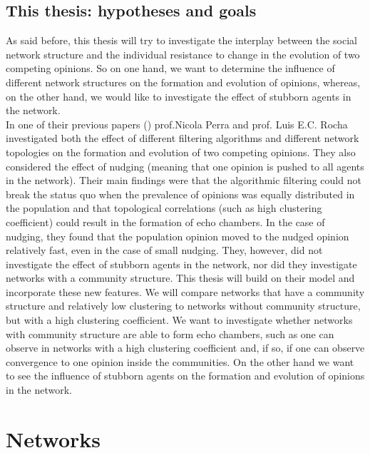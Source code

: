 \documentclass[11 pt , letterpaper , twoside , openright]{book}
\begin{document}
\section{This thesis: hypotheses and goals}

As said before, this thesis will try to investigate the interplay between the social network structure and the individual resistance to change in the evolution of two competing opinions. So on one hand, we want to determine the influence of different network structures on the formation and evolution of opinions, whereas, on the other hand, we would like to investigate the effect of stubborn agents in the network.\\ 
In one of their previous papers (\cite{Perra2019}) prof.Nicola Perra and prof. Luis E.C. Rocha investigated both the effect of different filtering algorithms and different network topologies on the formation and evolution of two competing opinions. They also considered the effect of nudging (meaning that one opinion is pushed to all agents in the network). Their main findings were that the algorithmic filtering could not break the status quo when the prevalence of opinions was equally distributed in the population and that topological correlations (such as high clustering coefficient) could result in the formation of echo chambers. In the case of nudging, they found that the population opinion moved to the nudged opinion relatively fast, even in the case of small nudging. They, however, did not investigate the effect of stubborn agents in the network, nor did they investigate networks with a community structure. This thesis will build on their model and incorporate these new features. We will compare networks that have a community structure and relatively low clustering to networks without community structure, but with a high clustering coefficient. We want to investigate whether networks with community structure are able to form echo chambers, such as one can observe in networks with a high clustering coefficient and, if so, if one can observe convergence to one opinion inside the communities. On the other hand we want to see the influence of stubborn agents on the formation and evolution of opinions in the network.



\chapter{Networks}
\label{chap2}
\end{document}
